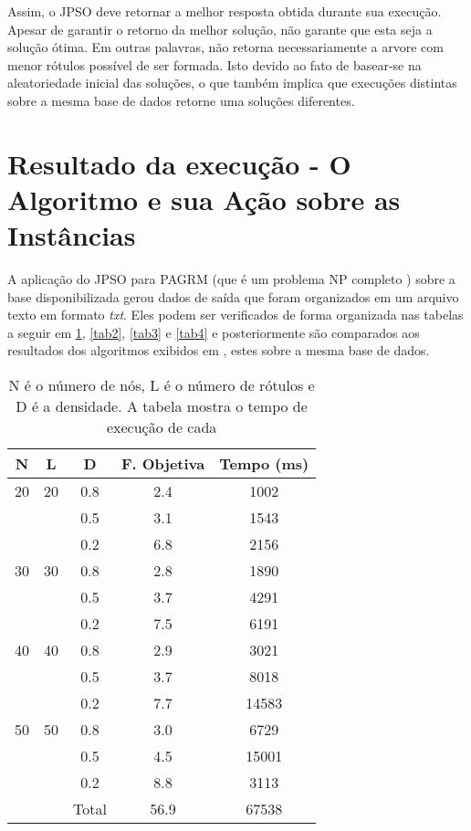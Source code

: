 \documentclass{sig-alternate-05-2015}
\begin{document}
Assim, o JPSO deve retornar a melhor resposta obtida durante sua execução. Apesar de garantir o retorno da melhor solução, não garante que esta seja a solução ótima. Em outras palavras, não retorna necessariamente a arvore com menor rótulos possível de ser formada. Isto devido ao fato de basear-se na aleatoriedade inicial das soluções, o que também implica que execuções distintas sobre a mesma base de dados retorne uma soluções diferentes.

\section*{Resultado da execução - O Algoritmo e sua Ação sobre as Instâncias} \label{sec4}
A aplicação do JPSO para PAGRM (que é um problema NP completo \cite{Ladner:1975:SPT:321864.321877}) sobre a base disponibilizada gerou dados de saída que foram organizados em um arquivo texto em formato \textit{txt}. Eles podem ser verificados de forma organizada nas tabelas a seguir em \ref{tab1}, \ref{tab2}, \ref{tab3} e \ref{tab4} e posteriormente são comparados aos resultados dos algoritmos exibidos em \cite{consoli2009greedy}, estes sobre a mesma base de dados. 
\begin{table}[!h]
	

\begin{tabular}{ccccc}

	\hline \rule[-2ex]{0pt}{5.5ex} N & L & D & F. Objetiva & Tempo (ms) \\ 
	\hline \rule[-2ex]{0pt}{5.5ex} 20 & 20 & 0.8 & 2.4 & 1002 \\ 
	 \rule[-2ex]{0pt}{5.5ex}  &  & 0.5 & 3.1 & 1543 \\ 
	 \rule[-2ex]{0pt}{5.5ex}  &  & 0.2 & 6.8 & 2156 \\ 
	 \rule[-2ex]{0pt}{5.5ex} 30 & 30 & 0.8 & 2.8 & 1890 \\ 
	 \rule[-2ex]{0pt}{5.5ex}  &  & 0.5 & 3.7 & 4291 \\ 
	 \rule[-2ex]{0pt}{5.5ex}  &  & 0.2 & 7.5 & 6191 \\ 
	 \rule[-2ex]{0pt}{5.5ex} 40 & 40 & 0.8 & 2.9 & 3021 \\ 
	 \rule[-2ex]{0pt}{5.5ex}  &  & 0.5 & 3.7 & 8018 \\ 
	 \rule[-2ex]{0pt}{5.5ex}  &  & 0.2 & 7.7 & 14583 \\ 
	 \rule[-2ex]{0pt}{5.5ex} 50 & 50 & 0.8 & 3.0 & 6729 \\ 
	 \rule[-2ex]{0pt}{5.5ex}  &  & 0.5 & 4.5 & 15001 \\ 
	 \rule[-2ex]{0pt}{5.5ex}  &  & 0.2 & 8.8 & 3113 \\ 
	\hline \rule[-2ex]{0pt}{5.5ex}  &  & Total & 56.9 & 67538 \\ 
	\hline 
\end{tabular} 

\caption{N é o número de nós, L é o número de rótulos e D é a densidade.  A tabela mostra o tempo de execução de cada}
\label{tab1}
\end{table}
\end{document}
